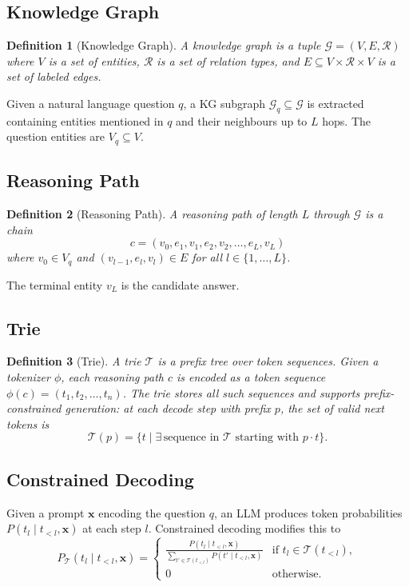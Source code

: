 \documentclass[11pt,a4paper]{article}
\newcommand{\G}{\mathcal{G}}
\newcommand{\T}{\mathcal{T}}
\newcommand{\R}{\mathcal{R}}
\newtheorem{definition}{Definition}
\begin{document}
\subsection{Knowledge Graph}

\begin{definition}[Knowledge Graph]
A knowledge graph is a tuple $\G = (V, E, \R)$ where $V$ is a set of
entities, $\R$ is a set of relation types, and $E \subseteq V \times
\R \times V$ is a set of labeled edges.
\end{definition}

Given a natural language question $q$, a KG subgraph $\G_q \subseteq
\G$ is extracted containing entities mentioned in $q$ and their
neighbours up to $L$ hops.  The question entities are $V_q \subseteq
V$.

\subsection{Reasoning Path}

\begin{definition}[Reasoning Path]
A reasoning path of length $L$ through $\G$ is a chain
\[
  c = (v_0, e_1, v_1, e_2, v_2, \ldots, e_L, v_L)
\]
where $v_0 \in V_q$ and $(v_{l-1}, e_l, v_l) \in E$ for all $l
\in \{1, \ldots, L\}$.
\end{definition}

The terminal entity $v_L$ is the candidate answer.

\subsection{Trie}

\begin{definition}[Trie]
A trie $\T$ is a prefix tree over token sequences.  Given a tokenizer
$\phi$, each reasoning path $c$ is encoded as a token sequence
$\phi(c) = (t_1, t_2, \ldots, t_n)$.  The trie stores all such
sequences and supports prefix-constrained generation: at each decode
step with prefix $p$, the set of valid next tokens is
\[
  \T(p) = \{ t \mid \exists\, \text{sequence in } \T \text{ starting
  with } p \cdot t \}.
\]
\end{definition}

\subsection{Constrained Decoding}

Given a prompt $\mathbf{x}$ encoding the question $q$, an LLM produces
token probabilities $P(t_l \mid t_{<l}, \mathbf{x})$ at each step
$l$.  Constrained decoding modifies this to
\[
  P_{\T}(t_l \mid t_{<l}, \mathbf{x}) =
  \begin{cases}
    \frac{P(t_l \mid t_{<l}, \mathbf{x})}{\sum_{t' \in \T(t_{<l})}
    P(t' \mid t_{<l}, \mathbf{x})} & \text{if } t_l \in \T(t_{<l}), \\
    0 & \text{otherwise}.
  \end{cases}
\]
\end{document}

